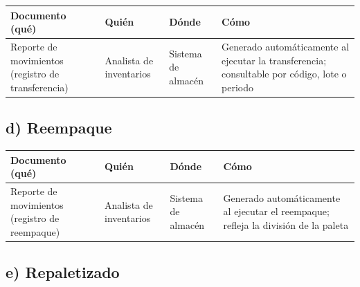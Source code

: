 \documentclass[11pt, a4paper, oneside]{report}
\begin{document}
\begin{table}[H]
\centering\small
\renewcommand{\arraystretch}{1.25}
\setlength{\tabcolsep}{5pt}
\begin{tabularx}{\textwidth}{|>{\raggedright\arraybackslash}X|>{\raggedright\arraybackslash}p{}|>{\raggedright\arraybackslash}p{}|>{\raggedright\arraybackslash}X|}
\hline
\rowcolor{upeu_mid}
\color{white}\bfseries Documento (qué) & \color{white}\bfseries Quién & \color{white}\bfseries Dónde & \color{white}\bfseries Cómo \\ \hline
\rowcolor{gray!10}
Reporte de movimientos (registro de transferencia) & Analista de inventarios & Sistema de almacén & Generado automáticamente al ejecutar la transferencia; consultable por código, lote o periodo \\ \hline
\end{tabularx}
\end{table}

\subsection*{d) Reempaque}

\begin{table}[H]
\centering\small
\renewcommand{\arraystretch}{1.25}
\setlength{\tabcolsep}{5pt}
\begin{tabularx}{\textwidth}{|>{\raggedright\arraybackslash}X|>{\raggedright\arraybackslash}p{}|>{\raggedright\arraybackslash}p{}|>{\raggedright\arraybackslash}X|}
\hline
\rowcolor{upeu_mid}
\color{white}\bfseries Documento (qué) & \color{white}\bfseries Quién & \color{white}\bfseries Dónde & \color{white}\bfseries Cómo \\ \hline
\rowcolor{gray!10}
Reporte de movimientos (registro de reempaque) & Analista de inventarios & Sistema de almacén & Generado automáticamente al ejecutar el reempaque; refleja la división de la paleta \\ \hline
\end{tabularx}
\end{table}

\subsection*{e) Repaletizado}
\end{document}
